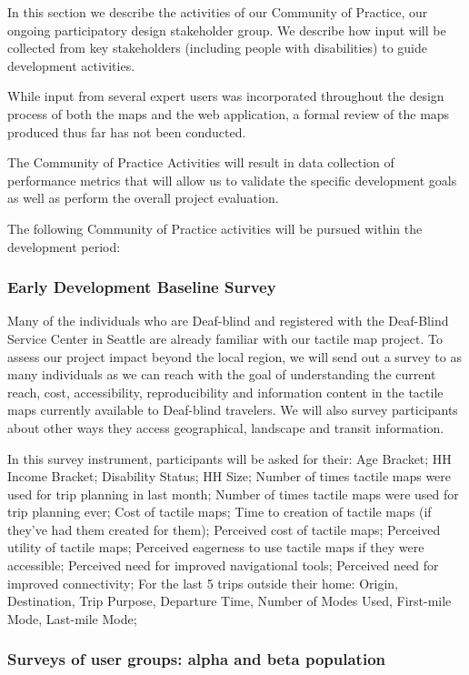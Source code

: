 \label{sec:stakeholder-input}
In this section we describe the activities of our Community of Practice, our ongoing participatory design stakeholder group. We describe how input will be collected from key stakeholders (including people with disabilities) to guide development activities.

While input from several expert users was incorporated throughout the design process of both the maps and the web application, a formal review of the maps produced thus far has not been conducted. 


The Community of Practice Activities will result in data collection of performance metrics that will allow us to validate the specific development goals as well as perform the overall project evaluation.

The following Community of Practice activities will be pursued within the development period:

\subsubsection{Early Development Baseline Survey}
\label{test:baseline}
Many of the individuals who are Deaf-blind and registered with the Deaf-Blind Service Center in Seattle are already familiar with our tactile map project. To assess our project impact beyond the local region, we will send out a survey to as many individuals as we can reach with the goal of understanding the current reach, cost, accessibility, reproducibility and information content in the tactile maps currently available to Deaf-blind travelers. We will also survey participants about other ways they access geographical, landscape and transit information. 

In this survey instrument, participants will be asked for their:  Age Bracket; HH Income Bracket; Disability Status; HH Size; Number of times tactile maps were used for trip planning in last month; Number of times tactile maps were used for trip planning ever; Cost of tactile maps; Time to creation of tactile maps (if they've had them created for them); Perceived cost of tactile maps; Perceived utility of tactile maps; Perceived eagerness to use tactile maps if they were accessible; Perceived need for improved navigational tools; Perceived need for improved connectivity; For the last 5 trips outside their home: Origin, Destination, Trip Purpose, Departure Time, Number of Modes Used, First-mile Mode, Last-mile Mode;

\subsubsection{Surveys of user groups: alpha and beta population}
\label{test:usersurvey}

